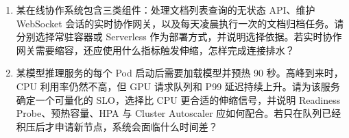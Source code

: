 \begin{tcolorbox}[breakable]
\begin{enumerate}
    \item 某在线协作系统包含三类组件：处理文档列表查询的无状态 API、维护 WebSocket 会话的实时协作网关，以及每天凌晨执行一次的文档归档任务。请分别选择常驻容器或 Serverless 作为部署方式，并说明选择依据。若实时协作网关需要缩容，还应使用什么指标触发伸缩，怎样完成连接排水？

    \item 某模型推理服务的每个 Pod 启动后需要加载模型并预热 90 秒。高峰到来时，CPU 利用率仍然不高，但 GPU 请求队列和 P99 延迟持续上升。请为该服务确定一个可量化的 SLO，选择比 CPU 更合适的伸缩信号，并说明 Readiness Probe、预热容量、HPA 与 Cluster Autoscaler 应如何配合。若只在队列已经积压后才申请新节点，系统会面临什么时间差？
\end{enumerate}
\end{tcolorbox}
  
\newpage
